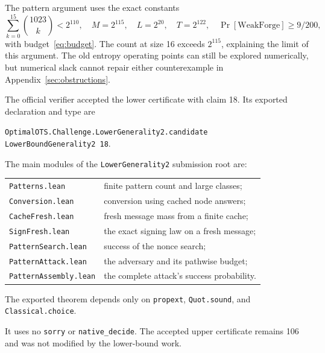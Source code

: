 \documentclass[10pt]{article}
\begin{document}
The pattern argument uses the exact constants
\[
\sum_{k=0}^{15}\binom{1023}{k}<2^{110},\quad
M=2^{115},\quad L=2^{20},\quad T=2^{122},\quad
\Pr[\mathrm{WeakForge}]\ge9/200,
\]
with budget~\eqref{eq:budget}. The count at size 16 exceeds $2^{115}$, explaining the limit of this argument. The old entropy operating points can still be explored numerically, but numerical slack cannot repair either counterexample in Appendix~\ref{sec:obstructions}.

The official verifier accepted the lower certificate with claim 18. Its exported declaration and type are
\begin{center}
\texttt{OptimalOTS.Challenge.LowerGenerality2.candidate}\\
\texttt{LowerBoundGenerality2 18}.
\end{center}
The main modules of the \texttt{LowerGenerality2} submission root are:
\begin{center}
\begin{tabular}{ll}
\texttt{Patterns.lean} & finite pattern count and large classes;\\
\texttt{Conversion.lean} & conversion using cached node answers;\\
\texttt{CacheFresh.lean} & fresh message mass from a finite cache;\\
\texttt{SignFresh.lean} & the exact signing law on a fresh message;\\
\texttt{PatternSearch.lean} & success of the nonce search;\\
\texttt{PatternAttack.lean} & the adversary and its pathwise budget;\\
\texttt{PatternAssembly.lean} & the complete attack's success probability.
\end{tabular}
\end{center}
The exported theorem depends only on \texttt{propext}, \texttt{Quot.sound}, and \texttt{Classical.choice}.

It uses no \texttt{sorry} or \texttt{native\_decide}. The accepted upper certificate remains 106 and was not modified by the lower-bound work.
\end{document}
